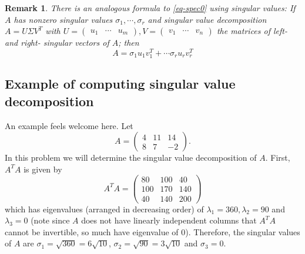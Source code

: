 \documentclass[12pt]{article}
\numberwithin{equation}{subsection}
\numberwithin{figure}{subsection}
\theoremstyle{note}
\newtheorem{remark}[subsection]{Remark}
\newcommand\m[1]{\begin{pmatrix}#1\end{pmatrix}}
\begin{document}
\begin{remark}
There is an analogous formula to \eqref{eq-spec0} using singular values: If $A$ has nonzero singular values $\sigma_1,\cdots,\sigma_r$ and singular value decomposition $A=U\Sigma V^T$ with $U=\m{u_1 & \cdots & u_m}, V=\m{v_1 & \cdots & v_n}$ the matrices of left- and right- singular vectors of $A$; then \begin{equation}
	A=\sigma_1 u_1v_1^T+\cdots \sigma_r u_r v_r^T \label{eq-sing}
\end{equation}
\end{remark}




\subsection{Example of computing singular value decomposition}
An example feels welcome here. Let \[A=\m{ 4 & 11 & 14 \\ 8 & 7 & -2}.\] In this problem we will determine the singular value decomposition of $A$. First, $A^TA$ is given by \[ A^TA=\m{80 & 100 & 40 \\ 100 & 170 & 140 \\ 40 & 140 & 200}\] which has eigenvalues (arranged in decreasing order) of $\lambda_1=360, \lambda_2=90$ and $\lambda_3=0$ (note since $A$ does not have linearly independent columns that $A^TA$ cannot be invertible, so much have eigenvalue of $0$). Therefore, the singular values of $A$ are $\sigma_1=\sqrt{360}=6\sqrt{10}$, $\sigma_2=\sqrt{90}=3\sqrt{10}$ and $\sigma_3=0$. 
\end{document}
